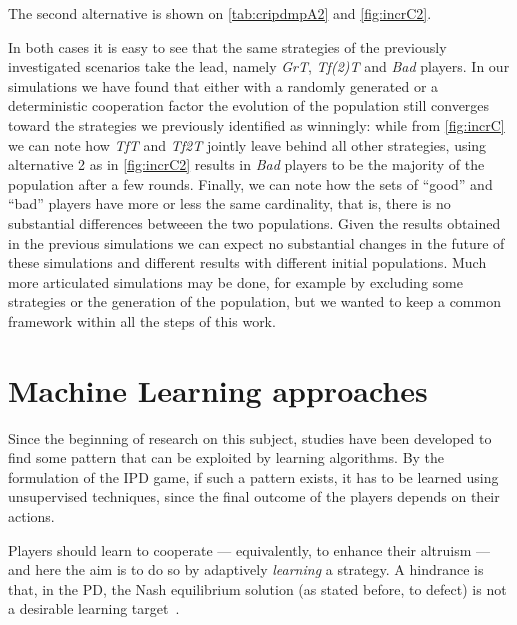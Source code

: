 \documentclass[journal,10pt,twoside]{IEEEtran}
\begin{document}

The second alternative is shown on \autoref{tab:cripdmpA2} and \autoref{fig:incrC2}.

In both cases it is easy to see that the same strategies of the previously investigated scenarios take the lead, namely \textit{GrT}, \textit{Tf(2)T} and \textit{Bad} players. In our simulations we have found that either with a randomly generated or a deterministic cooperation factor the evolution of the population still converges toward the strategies we previously identified as winningly: while from \autoref{fig:incrC} we can note how \textit{TfT} and \textit{Tf2T} jointly leave behind all other strategies, using alternative 2 as in \autoref{fig:incrC2} results in \textit{Bad} players to be the majority of the population after a few rounds.
Finally, we can note how the sets of ``good'' and ``bad'' players have more or less the same cardinality, that is, there is no substantial differences betweeen the two populations. Given the results obtained in the previous simulations we can expect no substantial changes in the future of these simulations and different results with different initial populations. Much more articulated simulations may be done, for example by excluding some strategies or the generation of the population, but we wanted to keep a common framework within all the steps of this work.

\section{Machine Learning approaches} \label{s:ml}
Since the beginning of research on this subject, studies have been developed to find some pattern that can be exploited by learning algorithms.
By the formulation of the IPD game, if such a pattern exists, it has to be learned using unsupervised techniques, since the final outcome of the players depends on their actions.

Players should learn to cooperate --- equivalently, to enhance their altruism --- and here the aim is to do so by adaptively \textit{learning} a strategy. A hindrance is that, in the PD, the Nash equilibrium solution (as stated before, to defect) is not a desirable learning target~\cite{coopSeqRL}.
\end{document}
